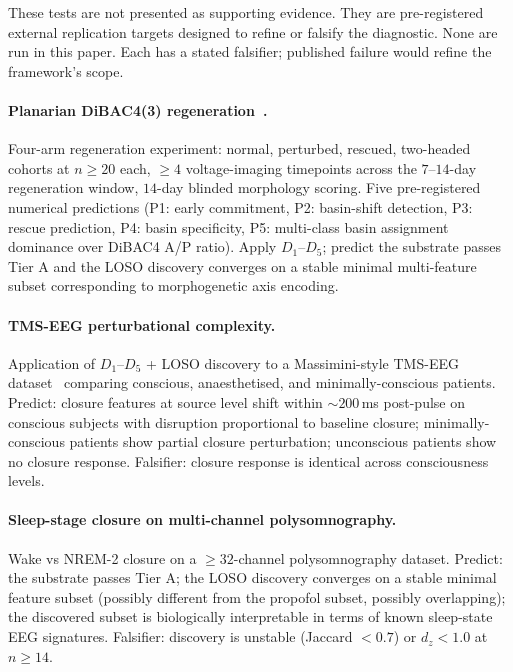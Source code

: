 \documentclass[11pt,a4paper]{article}
\begin{document}
These tests are not presented as supporting evidence. They are pre-registered external replication targets designed to refine or falsify the diagnostic. None are run in this paper. Each has a stated falsifier; published failure would refine the framework's scope.

\paragraph{Planarian DiBAC4(3) regeneration~\citep{SolutionLab001}.}
Four-arm regeneration experiment: normal, perturbed, rescued, two-headed cohorts at $n \geq 20$ each, $\geq 4$ voltage-imaging timepoints across the $7$--$14$-day regeneration window, $14$-day blinded morphology scoring. Five pre-registered numerical predictions (P1: early commitment, P2: basin-shift detection, P3: rescue prediction, P4: basin specificity, P5: multi-class basin assignment dominance over DiBAC4 A/P ratio). Apply $D_1$--$D_5$; predict the substrate passes Tier A and the LOSO discovery converges on a stable minimal multi-feature subset corresponding to morphogenetic axis encoding.

\paragraph{TMS-EEG perturbational complexity.}
Application of $D_1$--$D_5$ + LOSO discovery to a Massimini-style TMS-EEG dataset~\citep{casarotto2016stratification} comparing conscious, anaesthetised, and minimally-conscious patients. Predict: closure features at source level shift within $\sim 200$\,ms post-pulse on conscious subjects with disruption proportional to baseline closure; minimally-conscious patients show partial closure perturbation; unconscious patients show no closure response. Falsifier: closure response is identical across consciousness levels.

\paragraph{Sleep-stage closure on multi-channel polysomnography.}
Wake vs NREM-2 closure on a $\geq 32$-channel polysomnography dataset. Predict: the substrate passes Tier A; the LOSO discovery converges on a stable minimal feature subset (possibly different from the propofol subset, possibly overlapping); the discovered subset is biologically interpretable in terms of known sleep-state EEG signatures. Falsifier: discovery is unstable (Jaccard $< 0.7$) or $d_z < 1.0$ at $n \geq 14$.
\end{document}
